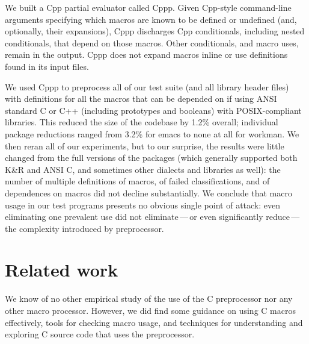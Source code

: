 \documentclass[10pt]{article}
\newcommand{\pkg}[1]{\textsf{#1}}
\begin{document}
We built a Cpp partial evaluator called Cppp.  Given Cpp-style command-line
arguments specifying which macros are known to be defined or undefined
(and, optionally, their expansions), Cppp discharges Cpp conditionals,
including nested conditionals, that
depend on those macros.  Other conditionals, and macro uses, remain in the
output.  Cppp does not expand macros inline or use definitions found in its
input files.



We used Cppp to preprocess all of our test suite (and all library header
files) with definitions for all the macros that can be depended on if using
ANSI standard C or C++ (including prototypes and booleans) with
POSIX-compliant libraries.
This reduced the size of the codebase by 1.2\% overall; individual package
reductions ranged from 3.2\% for \pkg{emacs} to none at all for \pkg{workman}.
We then reran all of our experiments, but to
our surprise, the
results were little changed from the full versions of the packages (which
generally supported both K\&R and ANSI C, and sometimes other dialects and
libraries as well): the number of multiple definitions of macros, of failed
classifications, and of dependences on macros did not decline
substantially.  We conclude that macro usage in our test programs presents
no obvious single point of attack: even eliminating one prevalent use did
not eliminate\,---\,or even significantly reduce\,---\,the complexity
introduced by preprocessor.


\section{Related work}
\label{sec:related}


We know of no other empirical study of the use of the C preprocessor
nor any other macro processor.  However, we did find some guidance on
using C macros effectively, tools for checking macro usage, and
techniques for understanding and exploring C source code that uses the
preprocessor.
\end{document}
